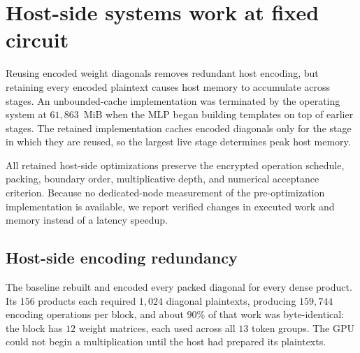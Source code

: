 %

\section{Host-side systems work at fixed circuit}
\label{sec:optimization}

Reusing encoded weight diagonals removes redundant host encoding, but retaining every encoded
plaintext causes host memory to accumulate across stages. An unbounded-cache implementation was
terminated by the operating system at $61{,}863$~MiB when the MLP began building templates on top of
earlier stages. The retained implementation caches encoded diagonals only for the stage in which
they are reused, so the largest live stage determines peak host memory.

All retained host-side optimizations preserve the encrypted operation schedule, packing, boundary
order, multiplicative depth, and numerical acceptance criterion. Because no dedicated-node
measurement of the pre-optimization implementation is available, we report verified changes in
executed work and memory instead of a latency speedup.

\subsection{Host-side encoding redundancy}
The baseline rebuilt and encoded every packed diagonal for every dense product. Its $156$ products
each required $1{,}024$ diagonal plaintexts, producing $159{,}744$ encoding operations per block,
and about $90\%$ of that work was byte-identical: the block has $12$ weight matrices, each used
across all $13$ token groups. The GPU could not begin a multiplication until the host had prepared
its plaintexts.

